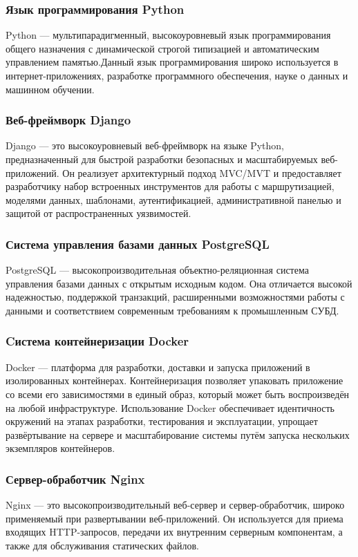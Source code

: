\subsubsection{Язык программирования Python}

Python — мультипарадигменный, высокоуровневый язык программирования общего назначения с динамической строгой типизацией и автоматическим управлением памятью.Данный язык программирования широко используется в интернет-приложениях, разработке программного обеспечения, науке о данных и машинном обучении.

\subsubsection{Веб-фреймворк Django}
Django — это высокоуровневый веб-фреймворк на языке Python, предназначенный для быстрой разработки безопасных и масштабируемых веб-приложений. Он реализует архитектурный подход MVC/MVT и предоставляет разработчику набор встроенных инструментов для работы с маршрутизацией, моделями данных, шаблонами, аутентификацией, административной панелью и защитой от распространенных уязвимостей.
\subsubsection{Система управления базами данных PostgreSQL}
PostgreSQL — высокопроизводительная объектно-реляционная система управления базами данных с открытым исходным кодом. Она отличается высокой надежностью, поддержкой транзакций, расширенными возможностями работы с данными и соответствием современным требованиям к промышленным СУБД.
\subsubsection{Cистема контейнеризации Docker}
Docker — платформа для разработки, доставки и запуска приложений в изолированных контейнерах. Контейнеризация позволяет упаковать приложение со всеми его зависимостями в единый образ, который может быть воспроизведён на любой инфраструктуре. Использование Docker обеспечивает идентичность окружений на этапах разработки, тестирования и эксплуатации, упрощает развёртывание на сервере и масштабирование системы путём запуска нескольких экземпляров контейнеров.
\subsubsection{Сервер-обработчик Nginx}
Nginx — это высокопроизводительный веб-сервер и сервер-обработчик, широко применяемый при развертывании веб-приложений. Он используется для приема входящих HTTP-запросов, передачи их внутренним серверным компонентам, а также для обслуживания статических файлов.
